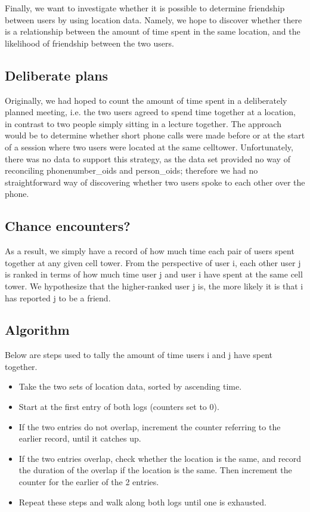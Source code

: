 \documentclass[pageno]{jpaper}
\begin{document}
Finally, we want to investigate whether it is possible to determine friendship between users by using location data. Namely, we hope to discover whether there is a relationship between the amount of time spent in the same location, and the likelihood of friendship between the two users. 

\subsection{Deliberate plans}

Originally, we had hoped to count the amount of time spent in a deliberately planned meeting, i.e. the two users agreed to spend time together at a location, in contrast to two people simply sitting in a lecture together. The approach would be to determine whether short phone calls were made before or at the start of a session where two users were located at the same celltower. Unfortunately, there was no data to support this strategy, as the data set provided no way of reconciling phonenumber\_oids and person\_oids; therefore we had no straightforward way of discovering whether two users spoke to each other over the phone.

\subsection{Chance encounters?}
As a result, we simply have a record of how much time each pair of users spent together at any given cell tower. From the perspective of user i, each other user j is ranked in terms of how much time user j and user i have spent at the same cell tower. We hypothesize that the higher-ranked user j is, the more likely it is that i has reported j to be a friend. 
\subsection{Algorithm}
Below are steps used to tally the amount of time users i and j have spent together. 
\begin{itemize}
\item Take the two sets of location data, sorted by ascending time.
\item Start at the first entry of both logs (counters set to 0).
\item If the two entries do not overlap, increment the counter referring to the earlier record, until it catches up.
\item If the two entries overlap, check whether the location is the same, and record the duration of the overlap if the location is the same. Then increment the counter for the earlier of the 2 entries.
\item Repeat these steps and walk along both logs until one is exhausted.
\end{itemize}
\end{document}
